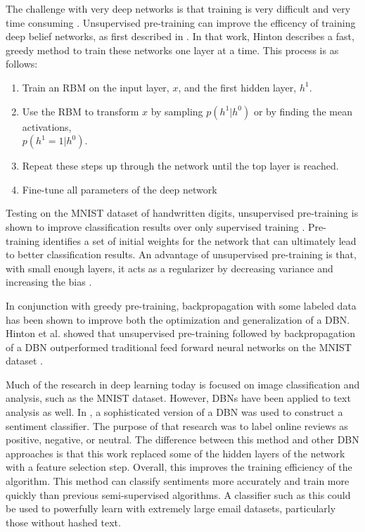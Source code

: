 \documentclass[12pt]{report}
\begin{document}
The challenge with very deep networks is that training is very difficult and very time consuming \cite{bengio_learning_2009}.
Unsupervised pre-training can improve the efficency of training deep belief networks, as first described in \cite{hinton_recognize_2007}.
In that work, Hinton describes a fast, greedy method to train these networks one layer at a time.  This process is as follows:
\begin{enumerate}
\item Train an RBM on the input layer, $x$, and the first hidden layer, $h^1$.
\item Use the RBM to transform $x$ by sampling $p(h^1|h^0)$ or by finding the mean activations,\\ $p(h^1=1|h^0)$.
\item Repeat these steps up through the network until the top layer is reached.
\item Fine-tune all parameters of the deep network
\end{enumerate}

 
Testing on the MNIST dataset of handwritten digits, unsupervised pre-training is shown to improve classification results over only supervised training  \cite{erhan_why_2010}. 
Pre-training identifies a set of initial weights for the network that can ultimately lead to better classification results.  
An advantage of unsupervised pre-training is that, with small enough layers, it acts as a regularizer by decreasing variance and increasing the bias \cite{hinton_recognize_2007}.  

In conjunction with greedy pre-training, backpropagation  with some labeled data has been shown to improve both the optimization and generalization of a DBN. 
Hinton et al. showed that unsupervised pre-training followed by backpropagation of a DBN outperformed traditional feed forward neural networks on the MNIST dataset \cite{hinton_fast_2006}.

Much of the research in deep learning today is focused on image classification and analysis, such as the MNIST dataset.  However, DBNs have been applied to text analysis as well.
In \cite{ruangkanokmas_deep}, a sophisticated version of a DBN was used to construct a sentiment classifier.
The purpose of that research was to label online reviews as positive, negative, or neutral.
The difference between this method and other DBN approaches is that this work replaced some of the hidden layers of the network with a feature selection step.
Overall, this improves the training efficiency of the algorithm.
This method can classify sentiments more accurately and train more quickly than previous semi-supervised algorithms.
A classifier such as this could be used to powerfully learn with extremely large email datasets, particularly those without hashed text.
\end{document}
